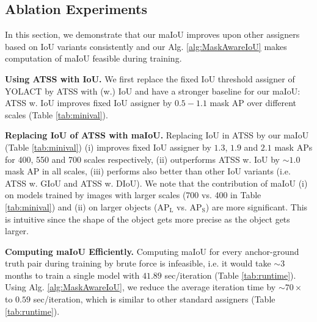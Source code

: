 \documentclass{bmvc2k}
\begin{document}
\subsection{Ablation Experiments}
In this section, we demonstrate that our maIoU improves upon other assigners based on IoU variants consistently and our Alg. \ref{alg:MaskAwareIoU} makes computation of maIoU feasible during training.

\noindent \textbf{Using ATSS with IoU.} We first replace the fixed IoU threshold assigner of YOLACT by ATSS with (w.) IoU and have a stronger baseline for our maIoU: ATSS w. IoU improves fixed IoU assigner by $0.5 - 1.1$ mask AP over different scales (Table \ref{tab:minival}).

\noindent \textbf{Replacing IoU of ATSS with maIoU.} Replacing IoU in ATSS by our maIoU  (Table \ref{tab:minival}) (i) improves fixed IoU assigner by $1.3$, $1.9$ and $2.1$ mask APs for 400, 550 and 700 scales respectively, (ii) outperforms ATSS w. IoU  by $\sim 1.0$ mask AP in all scales, (iii) performs also better than other IoU variants (i.e. ATSS w. GIoU and ATSS w. DIoU). We note that the contribution of maIoU (i) on models trained by images with larger scales (700 vs. 400 in Table \ref{tab:minival}) and (ii) on larger objects ($\mathrm{AP_{L}}$ vs. $\mathrm{AP_{S}}$) are more significant. This is intuitive since the shape of the object gets more precise as the object gets larger. 

\noindent \textbf{Computing maIoU Efficiently.} Computing maIoU for every anchor-ground truth pair during training by brute force is infeasible, i.e. it would take $\sim 3$ months to train a single model with $41.89$ sec/iteration (Table \ref{tab:runtime}). Using Alg. \ref{alg:MaskAwareIoU}, we reduce the average iteration time by $\sim 70\times$ to $0.59$ sec/iteration, which is similar to other standard assigners (Table \ref{tab:runtime}).
\end{document}
